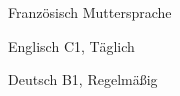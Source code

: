 

\begin{cvpairs}

  
\cvpair
    {Französisch} %
    {Muttersprache} %


\cvpair
    {Englisch} %
    {C1, Täglich} %


\cvpair
    {Deutsch} %
    {B1, Regelmäßig} %

\end{cvpairs}